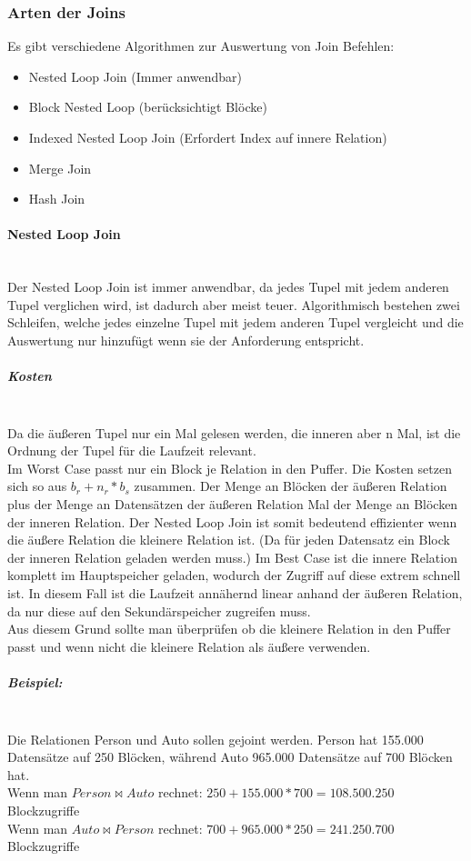 \documentclass{article}
\newcommand{\paragraphlb}[1]{\paragraph{#1}\mbox{}\\}
\newcommand{\subparagraphlb}[1]{\subparagraph{#1}\mbox{}\\}
\begin{document}
	\subsubsection{Arten der Joins}
	Es gibt verschiedene Algorithmen zur Auswertung von Join Befehlen:
	\begin{itemize}
		\item{Nested Loop Join (Immer anwendbar)}
		\item{Block Nested Loop (berücksichtigt Blöcke)}
		\item{Indexed Nested Loop Join (Erfordert Index auf innere Relation)}
		\item{Merge Join}
		\item{Hash Join}
	\end{itemize}
	\paragraphlb{Nested Loop Join}
	Der Nested Loop Join ist immer anwendbar, da jedes Tupel mit jedem anderen Tupel verglichen wird, ist dadurch aber meist teuer.
	Algorithmisch bestehen zwei Schleifen, welche jedes einzelne Tupel mit jedem anderen Tupel vergleicht und die Auswertung nur hinzufügt wenn sie der Anforderung entspricht.
	\subparagraphlb{Kosten}
	Da die äußeren Tupel nur ein Mal gelesen werden, die inneren aber n Mal, ist die Ordnung der Tupel für die Laufzeit relevant. \\
	Im Worst Case passt nur ein Block je Relation in den Puffer. Die Kosten setzen sich so aus $b_r+n_r*b_s$ zusammen. Der Menge an Blöcken der äußeren Relation plus der Menge an Datensätzen der äußeren Relation Mal der Menge an Blöcken der inneren Relation. Der Nested Loop Join ist somit bedeutend effizienter wenn die äußere Relation die kleinere Relation ist. (Da für jeden Datensatz ein Block der inneren Relation geladen werden muss.) 
	Im Best Case ist die innere Relation komplett im Hauptspeicher geladen, wodurch der Zugriff auf diese extrem schnell ist. In diesem Fall ist die Laufzeit annähernd linear anhand der äußeren Relation, da nur diese auf den Sekundärspeicher zugreifen muss. \\
	Aus diesem Grund sollte man überprüfen ob die kleinere Relation in den Puffer passt und wenn nicht die kleinere Relation als äußere verwenden.
	\subparagraphlb{Beispiel:}
	Die Relationen Person und Auto sollen gejoint werden. Person hat 155.000 Datensätze auf 250 Blöcken, während Auto 965.000 Datensätze auf 700 Blöcken hat. \\
	Wenn man $Person\bowtie Auto$ rechnet: $250+155.000*700=108.500.250$ Blockzugriffe \\
	Wenn man $Auto\bowtie Person$ rechnet: $700+965.000*250=241.250.700$ Blockzugriffe \\
\end{document}
